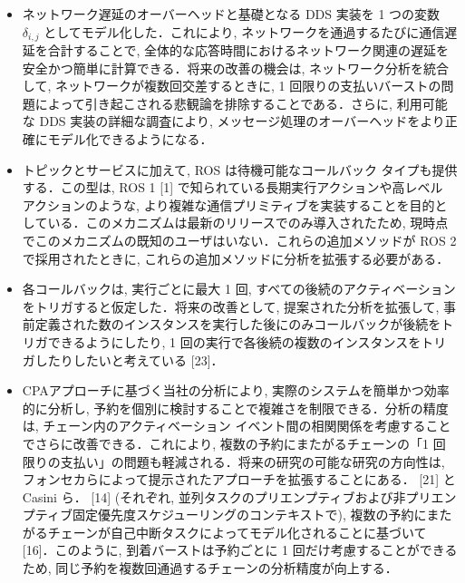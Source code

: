 \begin{frame}{}
    \begin{itemize}
        \item ネットワーク遅延のオーバーヘッドと基礎となる DDS 実装を 1 つの変数 $\delta_{i, j}$ としてモデル化した．これにより, ネットワークを通過するたびに通信遅延を合計することで, 全体的な応答時間におけるネットワーク関連の遅延を安全かつ簡単に計算できる．将来の改善の機会は, ネットワーク分析を統合して, ネットワークが複数回交差するときに, 1 回限りの支払いバーストの問題によって引き起こされる悲観論を排除することである．さらに, 利用可能な DDS 実装の詳細な調査により, メッセージ処理のオーバーヘッドをより正確にモデル化できるようになる．
    \end{itemize}
\end{frame}

\begin{frame}{}
    \begin{itemize}
        \item トピックとサービスに加えて, ROS は待機可能なコールバック タイプも提供する．この型は, ROS 1 [1] で知られている長期実行アクションや高レベル アクションのような, より複雑な通信プリミティブを実装することを目的としている．このメカニズムは最新のリリースでのみ導入されたため, 現時点でこのメカニズムの既知のユーザはいない．これらの追加メソッドが ROS 2 で採用されたときに, これらの追加メソッドに分析を拡張する必要がある．
    \end{itemize}
\end{frame}

\begin{frame}{}
    \begin{itemize}
        \item 各コールバックは, 実行ごとに最大 1 回, すべての後続のアクティベーションをトリガすると仮定した．将来の改善として, 提案された分析を拡張して, 事前定義された数のインスタンスを実行した後にのみコールバックが後続をトリガできるようにしたり, 1 回の実行で各後続の複数のインスタンスをトリガしたりしたいと考えている [23]．
    \end{itemize}
\end{frame}

\begin{frame}{}
    \begin{itemize}
        \item CPAアプローチに基づく当社の分析により, 実際のシステムを簡単かつ効率的に分析し, 予約を個別に検討することで複雑さを制限できる．分析の精度は, チェーン内のアクティベーション イベント間の相関関係を考慮することでさらに改善できる．これにより, 複数の予約にまたがるチェーンの「1 回限りの支払い」の問題も軽減される．将来の研究の可能な研究の方向性は, フォンセカらによって提示されたアプローチを拡張することにある． [21] と Casini ら． [14] (それぞれ, 並列タスクのプリエンプティブおよび非プリエンプティブ固定優先度スケジューリングのコンテキストで), 複数の予約にまたがるチェーンが自己中断タスクによってモデル化されることに基づいて [16]．このように, 到着バーストは予約ごとに 1 回だけ考慮することができるため, 同じ予約を複数回通過するチェーンの分析精度が向上する．
    \end{itemize}
\end{frame}

